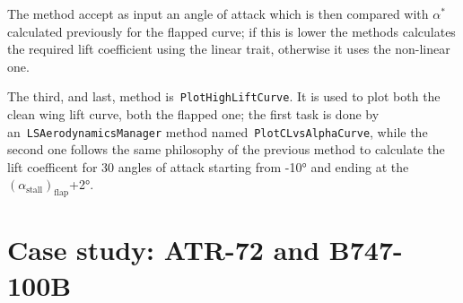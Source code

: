 The method accept as input an angle of attack which is then compared with $\alpha^*$ calculated previously for the flapped curve; if this is lower the methods calculates the required lift coefficient using the linear trait, otherwise it uses the non-linear one.

\bigskip
\noindent
The third, and last, method is~\lstinline[language=Java]!PlotHighLiftCurve!. It is used to plot both the clean wing lift curve, both the flapped one; the first task is done by an~\lstinline[language=Java]!LSAerodynamicsManager! method named~\lstinline[language=Java]!PlotCLvsAlphaCurve!, while the second one follows the same philosophy of the previous method to calculate the lift coefficent for 30 angles of attack starting from -10° and ending at the $\left(\alpha_{\text{stall}}\right)_{\text{flap}}$+2°.



\section{Case study: ATR-72 and B747-100B}

